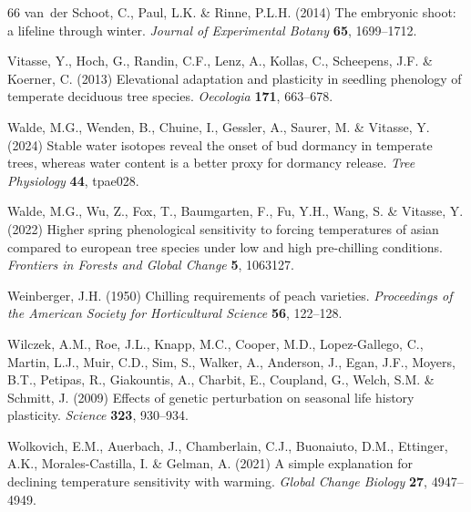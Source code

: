 \documentclass[11pt]{article}
\begin{document}
\begin{thebibliography}{66}
van~der Schoot, C., Paul, L.K. \& Rinne, P.L.H. (2014) The embryonic shoot: a
  lifeline through winter. \emph{Journal of Experimental Botany} \textbf{65},
  1699--1712.

Vitasse, Y., Hoch, G., Randin, C.F., Lenz, A., Kollas, C., Scheepens, J.F. \&
  Koerner, C. (2013) Elevational adaptation and plasticity in seedling
  phenology of temperate deciduous tree species. \emph{Oecologia} \textbf{171},
  663--678.

Walde, M.G., Wenden, B., Chuine, I., Gessler, A., Saurer, M. \& Vitasse, Y.
  (2024) Stable water isotopes reveal the onset of bud dormancy in temperate
  trees, whereas water content is a better proxy for dormancy release.
  \emph{Tree Physiology} \textbf{44}, tpae028.

Walde, M.G., Wu, Z., Fox, T., Baumgarten, F., Fu, Y.H., Wang, S. \& Vitasse, Y.
  (2022) Higher spring phenological sensitivity to forcing temperatures of
  asian compared to european tree species under low and high pre-chilling
  conditions. \emph{Frontiers in Forests and Global Change} \textbf{5},
  1063127.

Weinberger, J.H. (1950) Chilling requirements of peach varieties.
  \emph{Proceedings of the American Society for Horticultural Science}
  \textbf{56}, 122--128.

Wilczek, A.M., Roe, J.L., Knapp, M.C., Cooper, M.D., Lopez-Gallego, C., Martin,
  L.J., Muir, C.D., Sim, S., Walker, A., Anderson, J., Egan, J.F., Moyers,
  B.T., Petipas, R., Giakountis, A., Charbit, E., Coupland, G., Welch, S.M. \&
  Schmitt, J. (2009) Effects of genetic perturbation on seasonal life history
  plasticity. \emph{Science} \textbf{323}, 930--934.

Wolkovich, E.M., Auerbach, J., Chamberlain, C.J., Buonaiuto, D.M., Ettinger,
  A.K., Morales-Castilla, I. \& Gelman, A. (2021) A simple explanation for
  declining temperature sensitivity with warming. \emph{Global Change Biology}
  \textbf{27}, 4947--4949.


\end{thebibliography}
\end{document}
